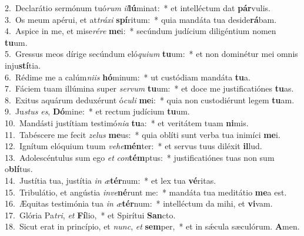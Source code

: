 {2.~}Declarátio sermónum tuó\textit{rum} \textit{il}\textbf{lú}minat:~* et intelléctum dat \textbf{pár}vulis.\\
{3.~}Os meum apérui, et at\textit{trá}\textit{xi} \textbf{spí}ritum:~* quia mandáta tua deside\textbf{rá}bam.\\
{4.~}Aspice in me, et mise\textit{ré}\textit{re} \textbf{me}i:~* secúndum judícium diligéntium nomen \textbf{tu}um.\\
{5.~}Gressus meos dírige secúndum eló\textit{qui}\textit{um} \textbf{tu}um:~* et non dominétur mei omnis inju\textbf{stí}tia.\\
{6.~}Rédime me a calúm\textit{ni}\textit{is} \textbf{hó}minum:~* ut custódiam mandáta \textbf{tu}a.\\
{7.~}Fáciem tuam illúmina super \textit{ser}\textit{vum} \textbf{tu}um:~* et doce me justificatiónes \textbf{tu}as.\\
{8.~}Exitus aquárum deduxérunt ó\textit{cu}\textit{li} \textbf{me}i:~* quia non custodiérunt legem \textbf{tu}am.\\
{9.~}Ju\textit{stus} \textit{es}, \textbf{Dó}mine:~* et rectum judícium \textbf{tu}um.\\
{10.~}Mandásti justítiam testimó\textit{ni}\textit{a} \textbf{tu}a:~* et veritátem tuam \textbf{ni}mis.\\
{11.~}Tabéscere me fecit \textit{ze}\textit{lus} \textbf{me}us:~* quia oblíti sunt verba tua inimíci \textbf{me}i.\\
{12.~}Ignítum elóquium tuum \textit{ve}\textit{he}\textbf{mén}ter:~* et servus tuus diléxit \textbf{il}lud.\\
{13.~}Adolescéntulus sum ego \textit{et} \textit{con}\textbf{tém}ptus:~* justificatiónes tuas non sum o\textbf{blí}tus.\\
{14.~}Justítia tua, justítia \textit{in} \textit{æ}\textbf{tér}num:~* et lex tua \textbf{vé}ritas.\\
{15.~}Tribulátio, et angústia \textit{in}\textit{ve}\textbf{né}runt me:~* mandáta tua meditátio \textbf{me}a est.\\
{16.~}Æquitas testimónia tua \textit{in} \textit{æ}\textbf{tér}num:~* intelléctum da mihi, et \textbf{vi}vam.\\
{17.~}Glória Pa\textit{tri}, \textit{et} \textbf{Fí}lio,~* et Spirítui \textbf{San}cto.\\
{18.~}Sicut erat in princípio, et \textit{nunc}, \textit{et} \textbf{sem}per,~* et in sǽcula sæculórum. \textbf{A}men.\\
